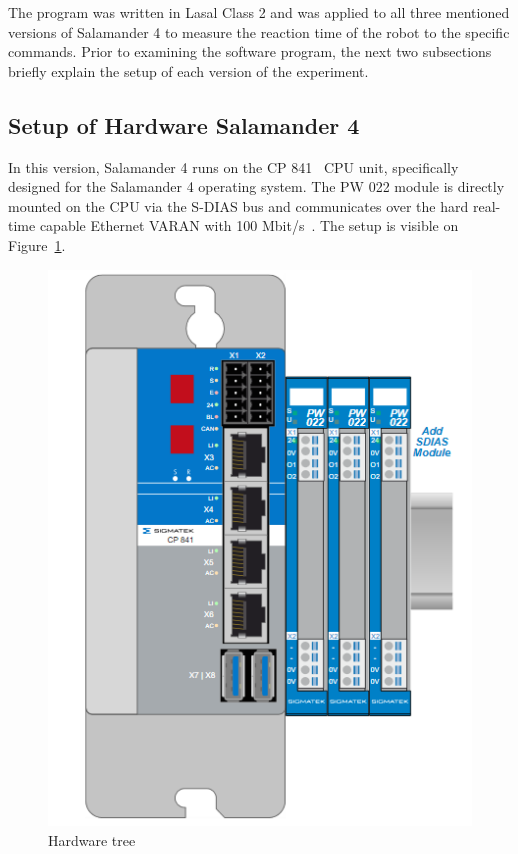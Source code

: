 \documentclass[MMR,Master,english]{twbook}
\begin{document}
\noindent The program was written in Lasal Class 2 and was applied to all three mentioned versions of Salamander 4 to measure the reaction time of the robot to the specific commands. Prior to examining the software program, the next two subsections briefly explain the setup of each version of the experiment.

\subsection{Setup of Hardware Salamander 4}
In this version, Salamander 4 runs on the CP 841~\cite{CPUEinheitenSIGMATEK} CPU unit, specifically designed for the Salamander 4 operating system. The PW 022 module is directly mounted on the CPU via the S-DIAS bus and communicates over the hard real-time capable Ethernet VARAN with 100 Mbit/s~\cite{SDIASSIGMATEK}. The setup is visible on Figure~\ref{fig:hardware_tree}.

\begin{figure}[H]
	\centering
	\includegraphics[width=0.5\columnwidth]{img/experiment/hardware_tree.png}
	\caption[Hardware tree]{Hardware tree}
	\label{fig:hardware_tree}
\end{figure}
\end{document}
